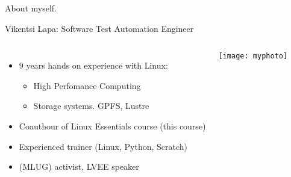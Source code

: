 \begin{frame}{About myself.}

    Vikentsi Lapa: Software Test Automation Engineer
    \begin{columns}
            \begin{itemize}
                \item 9 years hands on experience with Linux:
                \begin{itemize}
                    \item High Perfomance Computing
                    \item Storage systems. GPFS, Lustre
                \end{itemize}
                \item Coauthour of Linux Essentials course (this course)
                \item Experienced trainer (Linux, Python, Scratch) 
                \item (MLUG) activist, LVEE speaker
            \end{itemize}
            \center\texttt{[image: myphoto]}
    \end{columns}
\end{frame}
